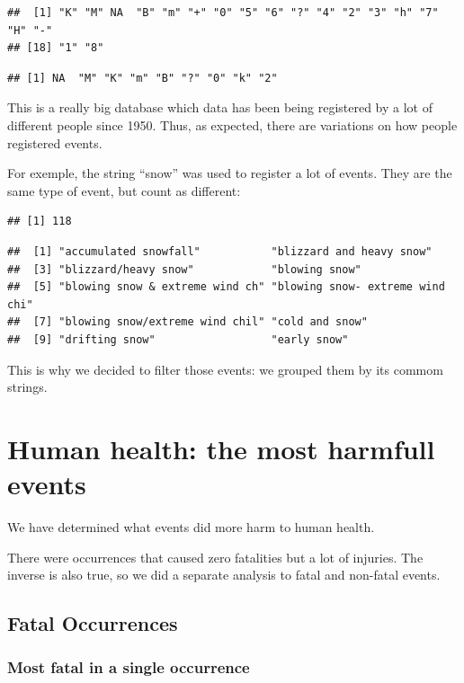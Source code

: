 \documentclass[]{article}
\begin{document}
\begin{verbatim}
##  [1] "K" "M" NA  "B" "m" "+" "0" "5" "6" "?" "4" "2" "3" "h" "7" "H" "-"
## [18] "1" "8"
\end{verbatim}

\begin{verbatim}
## [1] NA  "M" "K" "m" "B" "?" "0" "k" "2"
\end{verbatim}

This is a really big database which data has been being registered by a
lot of different people since 1950. Thus, as expected, there are
variations on how people registered events.

For exemple, the string ``snow'' was used to register a lot of events.
They are the same type of event, but count as different:

\begin{verbatim}
## [1] 118
\end{verbatim}

\begin{verbatim}
##  [1] "accumulated snowfall"           "blizzard and heavy snow"       
##  [3] "blizzard/heavy snow"            "blowing snow"                  
##  [5] "blowing snow & extreme wind ch" "blowing snow- extreme wind chi"
##  [7] "blowing snow/extreme wind chil" "cold and snow"                 
##  [9] "drifting snow"                  "early snow"
\end{verbatim}

This is why we decided to filter those events: we grouped them by its
commom strings.

\section{Human health: the most harmfull
events}\label{human-health-the-most-harmfull-events}

We have determined what events did more harm to human health.

There were occurrences that caused zero fatalities but a lot of
injuries. The inverse is also true, so we did a separate analysis to
fatal and non-fatal events.

\subsection{Fatal Occurrences}\label{fatal-occurrences}

\subsubsection{Most fatal in a single
occurrence}\label{most-fatal-in-a-single-occurrence}
\end{document}
